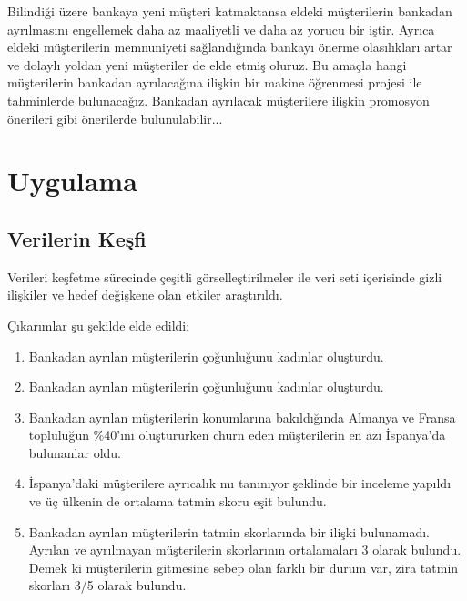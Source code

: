 \documentclass{article}
\begin{document}
\vspace{10pt}
Bilindiği üzere bankaya yeni müşteri katmaktansa eldeki müşterilerin bankadan ayrılmasını engellemek daha az maaliyetli ve daha az yorucu bir iştir. Ayrıca eldeki müşterilerin memnuniyeti sağlandığında bankayı önerme olasılıkları artar ve dolaylı yoldan yeni müşteriler de elde etmiş oluruz. Bu amaçla hangi müşterilerin bankadan ayrılacağına ilişkin bir makine öğrenmesi projesi ile tahminlerde bulunacağız. Bankadan ayrılacak müşterilere ilişkin promosyon önerileri gibi önerilerde bulunulabilir...


\clearpage
\section{Uygulama}
\subsection{Verilerin Keşfi}
Verileri keşfetme sürecinde çeşitli görselleştirilmeler ile veri seti içerisinde gizli ilişkiler ve hedef değişkene olan etkiler araştırıldı.

Çıkarımlar şu şekilde elde edildi:
\begin{enumerate}
    \item Bankadan ayrılan müşterilerin çoğunluğunu kadınlar oluşturdu. 
    \item Bankadan ayrılan müşterilerin çoğunluğunu kadınlar oluşturdu. 
    \item Bankadan ayrılan müşterilerin konumlarına bakıldığında Almanya ve Fransa topluluğun \%40'ını oluştururken churn eden müşterilerin en azı İspanya'da bulunanlar oldu.
    \item İspanya'daki müşterilere ayrıcalık mı tanınıyor şeklinde bir inceleme yapıldı ve üç ülkenin de ortalama tatmin skoru eşit bulundu.
    \item Bankadan ayrılan müşterilerin tatmin skorlarında bir ilişki bulunamadı. Ayrılan ve ayrılmayan müşterilerin skorlarının ortalamaları 3 olarak bulundu. Demek ki müşterilerin gitmesine sebep olan farklı bir durum var, zira tatmin skorları 3/5 olarak bulundu.
\end{enumerate}
\end{document}

